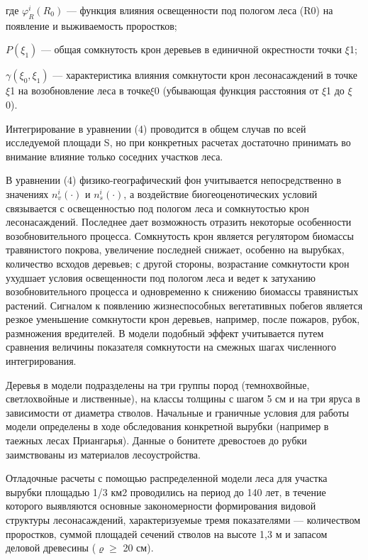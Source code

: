 \documentclass{report}
\begin{document}
где  $\varphi _R^i(R_0)$ — функция влияния освещенности под пологом леса (R0) на появление и выживаемость проростков;

 $P\left(\xi _1\right)$ — общая сомкнутость крон деревьев в единичной окрест\-ности точки ${\xi}$1;

 $\gamma \left(\xi _0,\xi _1\right)$ — характеристика влияния сомкнутости крон лесо\-насаждений в точке ${\xi}$1 на
возобновление леса в точке${\xi}$0 (убываю\-щая функция расстояния от ${\xi}$1 до ${\xi}$0).

Интегрирование в уравнении (4) проводится в общем случав по всей исследуемой площади S, но при конкретных расчетах
до\-статочно принимать во внимание влияние только соседних участ\-ков леса.

В уравнении (4) физико-географический фон учитывается непосредственно в значениях  $n_v^i(\cdot )$ и  $n_s^i(\cdot )$, а
воздействие биогеоценотических условий связывается с освещенностью под пологом леса и сомкнутостью крон лесонасаждений.
Последнее дает воз\-можность отразить некоторые особенности возобновительного про\-цесса. Сомкнутость крон является
регулятором биомассы травя\-нистого покрова, увеличение последней снижает, особенно на вы\-рубках, количество всходов
деревьев; с другой стороны, возрас\-тание сомкнутости крон ухудшает условия освещенности под по\-логом леса и ведет к
затуханию возобновительного процесса и одновременно к снижению биомассы травянистых растений. Сигналом к появлению
жизнеспособных вегетативных побегов является рез\-кое уменьшение сомкнутости крон деревьев, например, после по\-жаров,
рубок, размножения вредителей. В модели подобный эф\-фект учитывается путем сравнения величины показателя сомкну\-тости
на смежных шагах численного интегрирования.

Деревья в модели подразделены на три группы пород (темнохвойные, светлохвойные и лиственные), на классы толщины с
ша\-гом 5 см и на три яруса в зависимости от диаметра стволов. Началь\-ные и граничные условия для работы модели
определены в ходе обследования конкретной вырубки (например в таежных лесах Приангарья). Данные о бонитете древостоев
до рубки заимствованы из материалов лесоустройства.

Отладочные расчеты с помощью распределенной модели леса для участка вырубки пло\-щадью 1/3 км2 проводи\-лись на период
до 140 лет, в течение которого выявляются основ\-ные закономерности формирования видовой структуры лесонасаж\-дений,
характеризуемые тремя показателями — количеством про\-ростков, суммой площадей сечений стволов на высоте 1,3 м и
за\-пасом деловой древесины (${\varrho}$${\geq}$ 20 см).
\end{document}
